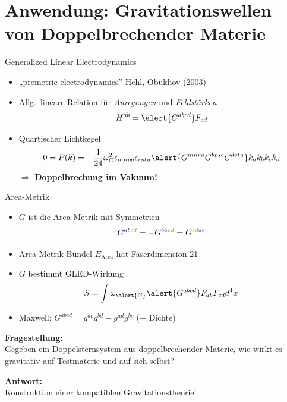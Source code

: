 \documentclass{beamer}
\begin{document}
    \section{Anwendung: Gravitationswellen von Doppelbrechender Materie}\label{sec:anwendung}

    \begin{frame}{Generalized Linear Electrodynamics}
        \begin{itemize}
            \item „premetric electrodynamics” {\scriptsize \lbrack Hehl, Obukhov (2003)\rbrack}
            \item Allg.\ lineare Relation für \textit{Anregungen} und \textit{Feldstärken}
            \[
                H^{ab} = \alert{G^{abcd}} F_{cd}
            \]
            \item Quartischer Lichtkegel \[ 0 = P(k) = -\frac{1}{24} \omega_G^2 \epsilon_{mnpq} \epsilon_{rstu} \alert{G^{mnra} G^{bpsc} G^{dqtu}} k_a k_b k_c k_d \]
            $\Rightarrow$ \textbf{Doppelbrechung im Vakuum!}
        \end{itemize}
    \end{frame}

    \begin{frame}{Area-Metrik}
        \begin{itemize}
            \item \alert{$G$} ist die \alert{Area-Metrik} mit Symmetrien
            \[ G^{\color{blue}ab\color{olive}cd} = -G^{\color{blue}ba\color{olive}cd} = G^{\color{olive}cd\color{blue}ab} \]
            \item Area-Metrik-Bündel $E_\text{Area}$ hat Faserdimension 21
            \item \alert{$G$} bestimmt GLED-Wirkung \[ S = \int \omega_{\alert{G}} \alert{G^{abcd}} F_{ab} F_{cd} d^4 x \]
            \item Maxwell: $G^{abcd} = g^{ac} g^{bd} - g^{ad} g^{bc}$ (+ Dichte)
        \end{itemize}
    \end{frame}

    \begin{frame}
        \textbf{Fragestellung:} \\
        Gegeben ein Doppelsternsystem aus doppelbrechender Materie, wie wirkt es
        gravitativ auf Testmaterie und auf sich selbst?

        \alert{
            \textbf{Antwort:} \\
            Konstruktion einer kompatiblen Gravitationstheorie!
        }
    \end{frame}
\end{document}

